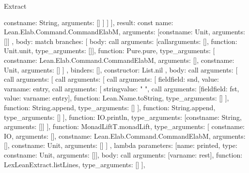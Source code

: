 \begin{lexlean}{Extract}
\begin{toolingmodule}
{{{{{                  const{name: String, arguments: []}
                ]
              }
            ]
          }
        }
      ],
      result: const{
        name: Lean.Elab.Command.CommandElabM,
        arguments: [const{name: Unit, arguments: []}]
      },
      body: match{
        branches: [
          {
            body: call{
              arguments: [call{arguments: [], function: Unit.unit, type_arguments: []}],
              function: Pure.pure,
              type_arguments: [
                const{name: Lean.Elab.Command.CommandElabM, arguments: []},
                const{name: Unit, arguments: []}
              ]
            },
            binders: [],
            constructor: List.nil
          },
          {
            body: call{
              arguments: [
                call{
                  arguments: [
                    call{
                      arguments: [
                        call{
                          arguments: [
                            field{field: snd, value: var{name: entry}},
                            call{
                              arguments: [
                                string{value: " "},
                                call{
                                  arguments: [field{field: fst, value: var{name: entry}}],
                                  function: Lean.Name.toString,
                                  type_arguments: []
                                }
                              ],
                              function: String.append,
                              type_arguments: []
                            }
                          ],
                          function: String.append,
                          type_arguments: []
                        }
                      ],
                      function: IO.println,
                      type_arguments: [const{name: String, arguments: []}]
                    }
                  ],
                  function: MonadLiftT.monadLift,
                  type_arguments: [
                    const{name: IO, arguments: []},
                    const{name: Lean.Elab.Command.CommandElabM, arguments: []},
                    const{name: Unit, arguments: []}
                  ]
                },
                lambda{
                  parameters: [{name: printed, type: const{name: Unit, arguments: []}}],
                  body: call{
                    arguments: [var{name: rest}],
                    function: LexLeanExtract.listLines,
                    type_arguments: []
                  }
                }
              ],
}}}}}
\end{toolingmodule}
\end{lexlean}
